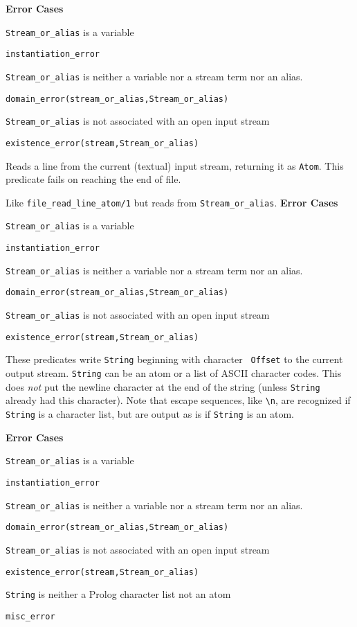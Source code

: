 \begin{description}
{\bf Error Cases} 
\bi
\item 	{\tt Stream\_or\_alias} is a variable
\bi
\item {\tt instantiation\_error}
\ei
\item 	{\tt Stream\_or\_alias} is neither a variable nor a stream term nor an alias.
\bi
\item 	{\tt domain\_error(stream\_or\_alias,Stream\_or\_alias)}
\ei
\item 	{\tt Stream\_or\_alias} is not associated with an open input stream
\bi
\item 	{\tt existence\_error(stream,Stream\_or\_alias)}
\ei
\ei

%
Reads a line from the current (textual) input stream, returning it as
{\tt Atom}.  This predicate fails on reaching the end of file.

Like {\tt file\_read\_line\_atom/1} but reads from {\tt Stream\_or\_alias}.
%
{\bf Error Cases} 
\bi
\item 	{\tt Stream\_or\_alias} is a variable
\bi
\item {\tt instantiation\_error}
\ei
\item 	{\tt Stream\_or\_alias} is neither a variable nor a stream term nor an alias.
\bi
\item 	{\tt domain\_error(stream\_or\_alias,Stream\_or\_alias)}
\ei
\item 	{\tt Stream\_or\_alias} is not associated with an open input stream
\bi
\item 	{\tt existence\_error(stream,Stream\_or\_alias)}
\ei
\ei

%
These predicates write {\tt String} beginning with character {\tt
  Offset} to the current output stream. {\tt String} can be an atom or
a list of ASCII character codes. This does \emph{not} put the newline
character at the end of the string (unless {\tt String} already had
this character). Note that escape sequences, like \verb|\n|, are
recognized if {\tt String} is a character list, but are output as is
if {\tt String} is an atom.

{\bf Error Cases}
\bi
\item 	{\tt Stream\_or\_alias} is a variable
\bi
\item {\tt instantiation\_error}
\ei
\item 	{\tt Stream\_or\_alias} is neither a variable nor a stream term nor an alias.
\bi
\item 	{\tt domain\_error(stream\_or\_alias,Stream\_or\_alias)}
\ei
\item 	{\tt Stream\_or\_alias} is not associated with an open input stream
\bi
\item 	{\tt existence\_error(stream,Stream\_or\_alias)}
\ei
\item {\tt String} is neither a Prolog character list not an atom
\bi
\item {\tt misc\_error}
\ei
\ei


\end{description}
